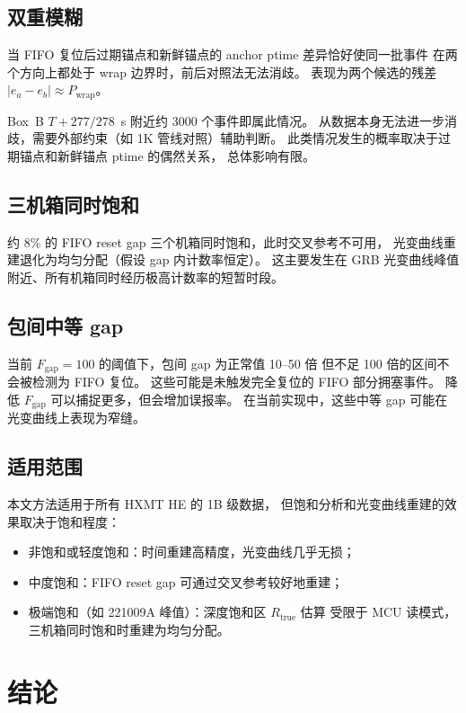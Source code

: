 \documentclass[aps,prd,twocolumn,nofootinbib,superscriptaddress]{revtex4-2}
\begin{document}
\subsection{双重模糊}

当 FIFO 复位后过期锚点和新鲜锚点的 anchor ptime 差异恰好使同一批事件
在两个方向上都处于 wrap 边界时，前后对照法无法消歧。
表现为两个候选的残差 $|e_a - e_b| \approx P_\mathrm{wrap}$。

Box~B $T+277/278$~s 附近约 3000 个事件即属此情况。
从数据本身无法进一步消歧，需要外部约束（如 1K 管线对照）辅助判断。
此类情况发生的概率取决于过期锚点和新鲜锚点 ptime 的偶然关系，
总体影响有限。

\subsection{三机箱同时饱和}

约 8\% 的 FIFO reset gap 三个机箱同时饱和，此时交叉参考不可用，
光变曲线重建退化为均匀分配（假设 gap 内计数率恒定）。
这主要发生在 GRB 光变曲线峰值附近、所有机箱同时经历极高计数率的短暂时段。

\subsection{包间中等 gap}

当前 $F_\mathrm{gap} = 100$ 的阈值下，包间 gap 为正常值 10--50 倍
但不足 100 倍的区间不会被检测为 FIFO 复位。
这些可能是未触发完全复位的 FIFO 部分拥塞事件。
降低 $F_\mathrm{gap}$ 可以捕捉更多，但会增加误报率。
在当前实现中，这些中等 gap 可能在光变曲线上表现为窄缝。

\subsection{适用范围}

本文方法适用于所有 HXMT HE 的 1B 级数据，
但饱和分析和光变曲线重建的效果取决于饱和程度：
\begin{itemize}
  \item 非饱和或轻度饱和：时间重建高精度，光变曲线几乎无损；
  \item 中度饱和：FIFO reset gap 可通过交叉参考较好地重建；
  \item 极端饱和（如 221009A 峰值）：深度饱和区 $R_\mathrm{true}$ 估算
    受限于 MCU 读模式，三机箱同时饱和时重建为均匀分配。
\end{itemize}

\section{结论}\label{sec:conclusion}
\end{document}
